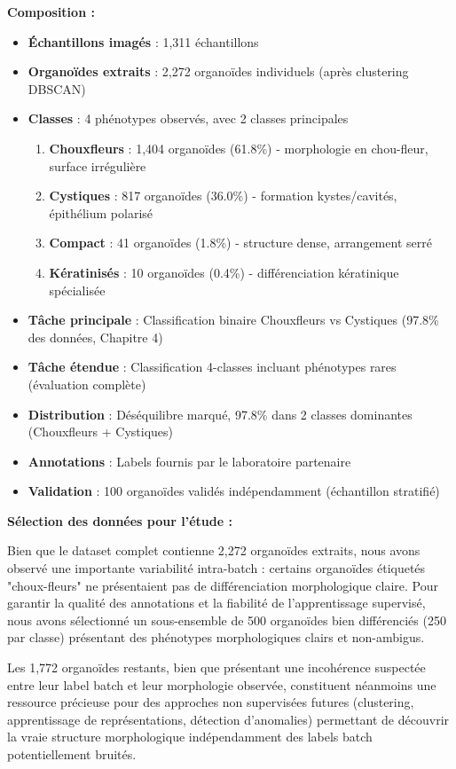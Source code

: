 \textbf{Composition :}
\begin{itemize}
    \item \textbf{Échantillons imagés} : 1,311 échantillons
    \item \textbf{Organoïdes extraits} : 2,272 organoïdes individuels (après clustering DBSCAN)
    \item \textbf{Classes} : 4 phénotypes observés, avec 2 classes principales
    \begin{enumerate}
        \item \textbf{Chouxfleurs} : 1,404 organoïdes (61.8\%) - morphologie en chou-fleur, surface irrégulière
        \item \textbf{Cystiques} : 817 organoïdes (36.0\%) - formation kystes/cavités, épithélium polarisé
        \item \textbf{Compact} : 41 organoïdes (1.8\%) - structure dense, arrangement serré
        \item \textbf{Kératinisés} : 10 organoïdes (0.4\%) - différenciation kératinique spécialisée
    \end{enumerate}
    \item \textbf{Tâche principale} : Classification binaire Chouxfleurs vs Cystiques (97.8\% des données, Chapitre 4)
    \item \textbf{Tâche étendue} : Classification 4-classes incluant phénotypes rares (évaluation complète)
    \item \textbf{Distribution} : Déséquilibre marqué, 97.8\% dans 2 classes dominantes (Chouxfleurs + Cystiques)
    \item \textbf{Annotations} : Labels fournis par le laboratoire partenaire
    \item \textbf{Validation} : 100 organoïdes validés indépendamment (échantillon stratifié)
\end{itemize}

\textbf{Sélection des données pour l'étude :}

Bien que le dataset complet contienne 2,272 organoïdes extraits, nous avons observé une importante variabilité intra-batch : certains organoïdes étiquetés "choux-fleurs" ne présentaient pas de différenciation morphologique claire. Pour garantir la qualité des annotations et la fiabilité de l'apprentissage supervisé, nous avons sélectionné un sous-ensemble de 500 organoïdes bien différenciés (250 par classe) présentant des phénotypes morphologiques clairs et non-ambigus.

Les 1,772 organoïdes restants, bien que présentant une incohérence suspectée entre leur label batch et leur morphologie observée, constituent néanmoins une ressource précieuse pour des approches non supervisées futures (clustering, apprentissage de représentations, détection d'anomalies) permettant de découvrir la vraie structure morphologique indépendamment des labels batch potentiellement bruités.

